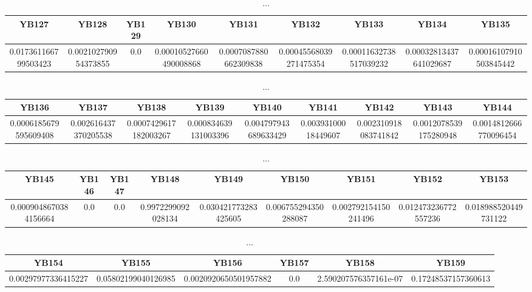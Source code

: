 \documentclass[]{article}
\begin{document}
\begin{table}[h]
      \centering
      \begin{tabular}{|c|c|c|c|c|c|c|c|c|}
            \hline
            YB127                & YB128                & YB129 & YB130                  & YB131                 & YB132                  & YB133                  & YB134                  & YB135                  \\
            \hline
            0.017361166799503423 & 0.002102790954373855 & 0.0   & 0.00010527660490008868 & 0.0007087880662309838 & 0.00045568039271475354 & 0.00011632738517039232 & 0.00032813437641029687 & 0.00016107910503845442 \\
            \hline
      \end{tabular}
      \caption{...}
\end{table}
\begin{table}[h]
      \centering
      \begin{tabular}{|c|c|c|c|c|c|c|c|c|}
            \hline
            YB136                 & YB137                & YB138                 & YB139                & YB140                & YB141               & YB142                & YB143                 & YB144                 \\
            \hline
            0.0006185679595609408 & 0.002616437370205538 & 0.0007429617182003267 & 0.000834639131003396 & 0.004797943689633429 & 0.00393100018449607 & 0.002310918083741842 & 0.0012078539175280948 & 0.0014812666770096454 \\
            \hline
      \end{tabular}
      \caption{...}
\end{table}
\begin{table}[h]
      \centering
      \begin{tabular}{|c|c|c|c|c|c|c|c|c|}
            \hline
            YB145                 & YB146 & YB147 & YB148              & YB149                & YB150                & YB151                & YB152                & YB153                \\
            \hline
            0.0009048670384156664 & 0.0   & 0.0   & 0.9972299092028134 & 0.030421773283425605 & 0.006755294350288087 & 0.002792154150241496 & 0.012473236772557236 & 0.018988520449731122 \\
            \hline
      \end{tabular}
      \caption{...}
\end{table}
\begin{table}[h]
      \centering
      \begin{tabular}{|c|c|c|c|c|c|}
            \hline
            YB154               & YB155               & YB156                 & YB157 & YB158                 & YB159               \\
            \hline
            0.00297977336415227 & 0.05802199040126985 & 0.0020920650501957882 & 0.0   & 2.590207576357161e-07 & 0.17248537157360613 \\
            \hline
      \end{tabular}
      \caption{...}
\end{table}
\end{document}
